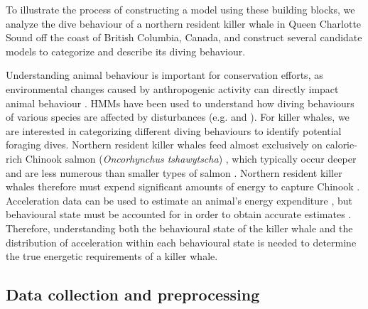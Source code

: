 

To illustrate the process of constructing a model using these building blocks, we analyze the dive behaviour of a northern resident killer whale in Queen Charlotte Sound off the coast of British Columbia, Canada, and construct several candidate models to categorize and describe its diving behaviour.

Understanding animal behaviour is important for conservation efforts, as environmental changes caused by anthropogenic activity can directly impact animal behaviour \citep{Sutherland:1998}. HMMs have been used to understand how diving behaviours of various species are affected by disturbances (e.g. \citet{DeRuiter:2017} and \citet{Isojunno:2017}). For killer whales, we are interested in categorizing different diving behaviours to identify potential foraging dives. Northern resident killer whales feed almost exclusively on calorie-rich Chinook salmon (\textit{Oncorhynchus tshawytscha}) \citep{Ford:2006}, which typically occur deeper and are less numerous than smaller types of salmon \citep{Ford:2009}. Northern resident killer whales therefore must expend significant amounts of energy to capture Chinook \citep{Williams:2009,Noren:2011,Wright:2017}. 
Acceleration data can be used to estimate an animal's energy expenditure \citep{Green:2009,Wilson:2019}, but behavioural state must be accounted for in order to obtain accurate estimates \citep{Dot:2016}. Therefore, understanding both the behavioural state of the killer whale and the distribution of acceleration within each behavioural state is needed to determine the true energetic requirements of a killer whale.

\subsection{Data collection and preprocessing}

